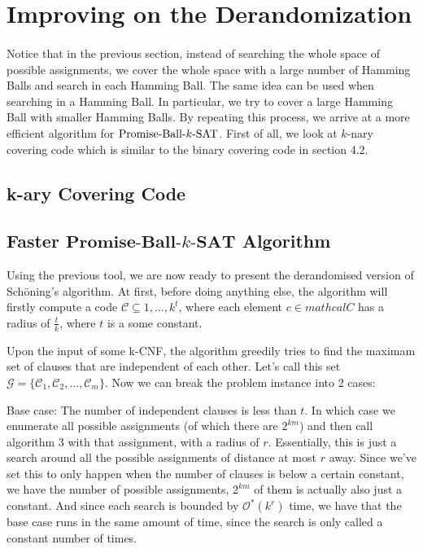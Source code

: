 \documentclass[a4paper,12pts]{article}
\newcommand{\SAT}{\textnormal{$k$-SAT}}
\newcommand{\SATbf}{\textbf{$k$-SAT}}
\newcommand{\PBS}{\textnormal{Promise-Ball-$\SAT$}}
\newcommand{\PBSbf}{\textbf{Promise-Ball-$\SATbf$}}
\renewcommand{\O}{\mathcal{O}^*}
\begin{document}
\section{Improving on the Derandomization\cite{Moser11}}
\paragraph{} Notice that in the previous section, instead of searching the whole space of possible assignments, we cover the whole space with a large number of Hamming Balls and search in each Hamming Ball. The same idea can be used when searching in a Hamming Ball. In particular, we try to cover a large Hamming Ball with smaller Hamming Balls. By repeating this process, we arrive at a more efficient algorithm for $\PBS$. First of all, we look at $k$-nary covering code which is similar to the binary covering code in section 4.2.
\subsection{k-ary Covering Code}
\subsection{Faster $\PBSbf$ Algorithm}
Using the previous tool, we are now ready to present the derandomised version of Sch\"{o}ning's algorithm. At first, before doing anything else, the algorithm will firstly compute a code $\mathcal{C} \subseteq {1, ...,k}^t$, where each element $c \in mathcal{C}$ has a radius of $\frac{t}{k}$, where $t$ is a some constant.\par


Upon the input of some k-CNF, the algorithm greedily tries to find the maximam set of clauses that are independent of each other. Let's call this set $\mathcal{G} = \{\mathcal{C}_1, \mathcal{C}_2, ...,\mathcal{C}_m\}$. Now we can break the problem instance into 2 cases: \par

Base case: The number of independent clauses is less than $t$. In which case we enumerate all possible assignments (of which there are $2^{km}$) and then call algorithm 3 with that assignment, with a radius of $r$. Essentially, this is just a search around all the possible assignments of distance at most $r$ away. Since we've set this to only happen when the number of clauses is below a certain constant, we have the number of possible assignments, $2^{km}$ of them is actually also just a constant. And since each search is bounded by $\O(k^r)$ time, we have that the base case runs in the same amount of time, since the search is only called a constant number of times.\par
\end{document}
